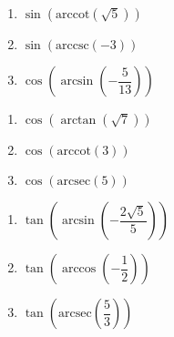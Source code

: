 \documentclass{ximera}
\begin{document}
\begin{multicols}{3}

\begin{enumerate}

\setcounter{enumi}{\value{HW}}

\item  $\sin\left(\text{arccot}\left(\sqrt{5}\right)\right)$ 
\item  $\sin\left(\text{arccsc}\left(-3\right)\right)$ 
\item  $\cos\left(\arcsin\left(-\dfrac{5}{13}\right)\right)$

\setcounter{HW}{\value{enumi}}

\end{enumerate}

\end{multicols}

\begin{multicols}{3}

\begin{enumerate}

\setcounter{enumi}{\value{HW}}

\item  $\cos\left(\arctan\left(\sqrt{7} \right)\right)$
\item  $\cos\left(\text{arccot}\left( 3 \right)\right)$
\item  $\cos\left(\text{arcsec}\left( 5 \right)\right)$

\setcounter{HW}{\value{enumi}}

\end{enumerate}

\end{multicols}

\begin{multicols}{3}

\begin{enumerate}

\setcounter{enumi}{\value{HW}}

\item  $\tan\left(\arcsin\left(-\dfrac{2\sqrt{5}}{5}\right)\right)$
\item  $\tan\left(\arccos\left(-\dfrac{1}{2}\right)\right)$ 
\item  $\tan\left(\text{arcsec}\left(\dfrac{5}{3}\right)\right)$ 

\setcounter{HW}{\value{enumi}}

\end{enumerate}

\end{multicols}
\end{document}
